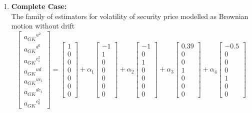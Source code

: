 \documentclass[12pt]{article}   	%
\begin{document}
\begin{enumerate}
\item \textbf{Complete Case:}\\
The family of estimators for volatility of security price modelled as Brownian motion without drift
$$\begin{bmatrix}
{a_{GK}}^{u^2}\\
{a_{GK}}^{d^2}\\
{a_{GK}}^{c_1^2}\\
{a_{GK}}^{ud}\\
{a_{GK}}^{uc_1}\\
{a_{GK}}^{dc_1}\\
{a_{GK}}^{c_0^2}
\end{bmatrix}=
\begin{bmatrix}
1\\
0\\
0\\
0\\
0\\
0\\
0
\end{bmatrix}+\alpha_1
\begin{bmatrix}
-1\\
1\\
0\\
0\\
0\\
0\\
0
\end{bmatrix}+\alpha_2
\begin{bmatrix}
-1\\
0\\
1\\
0\\
0\\
0\\
0
\end{bmatrix}
+\alpha_3
\begin{bmatrix}
0.39\\
0\\
0\\
1\\
0\\
0\\
0
\end{bmatrix}
+\alpha_4
\begin{bmatrix}
-0.5\\
0\\
0\\
0\\
1\\
0\\
0
\end{bmatrix}
$$
\end{enumerate}
\end{document}
